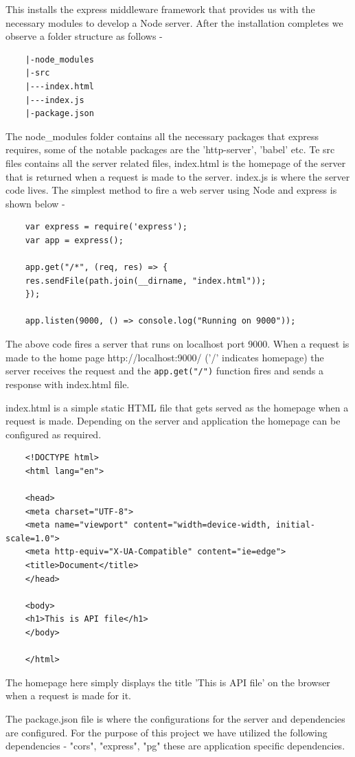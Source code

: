 \documentclass[../thesis.tex]{subfiles}
\begin{document}
	This installs the express middleware framework that provides us with the necessary modules to develop a Node server. After the installation completes we observe a folder structure as follows - 
	\begin{verbatim}
	|-node_modules
	|-src
	|---index.html
	|---index.js
	|-package.json
	\end{verbatim}
	The node\_modules folder contains all the necessary packages that express requires, some of the notable packages are the 'http-server', 'babel' etc. Te src files contains all the server related files, index.html is the homepage of the server that is returned when a request is made to the server. index.js is where the server code lives. The simplest method to fire a web server using Node and express is shown below - 
	\begin{verbatim}
	var express = require('express');
	var app = express();
	
	app.get("/*", (req, res) => {
	res.sendFile(path.join(__dirname, "index.html"));
	});
	
	app.listen(9000, () => console.log("Running on 9000"));
	\end{verbatim}
	The above code fires a server that runs on localhost port 9000. When a request is made to the home page http://localhost:9000/ ('/' indicates homepage) the server receives the request and the \lstinline|app.get("/")| function fires and sends a response with index.html file.
	\newline

	index.html is a simple static HTML file that gets served as the homepage when a request is made. Depending on the server and application the homepage can be configured as required.
	\begin{verbatim}
	<!DOCTYPE html>
	<html lang="en">
	
	<head>
	<meta charset="UTF-8">
	<meta name="viewport" content="width=device-width, initial-scale=1.0">
	<meta http-equiv="X-UA-Compatible" content="ie=edge">
	<title>Document</title>
	</head>
	
	<body>
	<h1>This is API file</h1>
	</body>
	
	</html>
	\end{verbatim}
	The homepage here simply displays the title 'This is API file' on the browser when a request is made for it.
	\newline

	The package.json file is where the configurations for the server and dependencies are configured. For the purpose of this project we have utilized the following dependencies - "cors", "express", "pg" these are application specific dependencies.
	\newline
\end{document}
